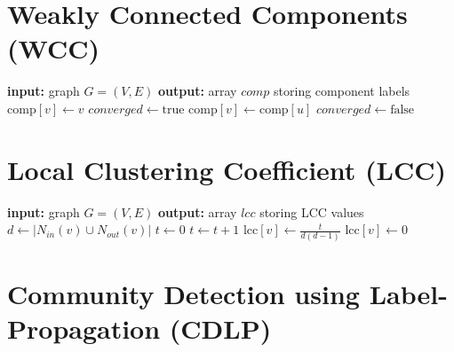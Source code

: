 \clearpage

\section{Weakly Connected Components (WCC)}

\begin{algorithm}[h!]
\begin{algorithmic}[1]
\Statex \textbf{input:} graph $G=(V,E)$
\Statex \textbf{output:} array $comp$ storing component labels
  \State $\text{comp}[v] \gets v$  
\EndFor
\Repeat
\State $converged \gets \text{true}$
      \State $\text{comp}[v] \gets \text{comp}[u]$
      \State $converged \gets \text{false}$
     \EndIf
  \EndFor
\EndFor
{}
\end{algorithmic}
\end{algorithm}


\section{Local Clustering Coefficient (LCC)}

\begin{algorithm}[h!]
\begin{algorithmic}[1]
\Statex \textbf{input:} graph $G=(V,E)$
\Statex \textbf{output:} array $lcc$ storing LCC values
   \State $d \gets |N_{in}(v) \cup N_{out}(v)|$
  \State $t \gets 0$
      \State $t  \gets t + 1$
     \EndIf
    \EndFor
  \EndFor
    \State $\text{lcc}[v] \gets \frac{t}{d(d-1)} $
  \Else
    \State $\text{lcc}[v] \gets 0$
  \EndIf
\EndFor
\end{algorithmic}
\end{algorithm}

\clearpage

\section{Community Detection using Label-Propagation (CDLP)}

